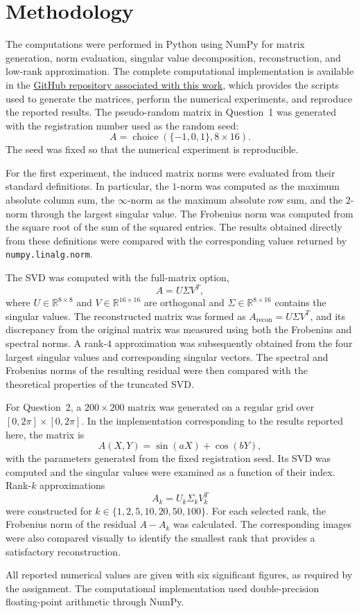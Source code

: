 \section{Methodology}

The computations were performed in Python using NumPy for matrix generation, norm evaluation, singular value decomposition, reconstruction, and low-rank approximation. The complete computational implementation is available in the \href{https://github.com/Ederson-Passos/computational-matrix-methods}{GitHub repository associated with this work}, which provides the scripts used to generate the matrices, perform the numerical experiments, and reproduce the reported results. The pseudo-random matrix in Question~1 was generated with the registration number used as the random seed:
\[
A = \operatorname{choice}(\{-1,0,1\}, 8\times16).
\]
The seed was fixed so that the numerical experiment is reproducible.

For the first experiment, the induced matrix norms were evaluated from their standard definitions. In particular, the $1$-norm was computed as the maximum absolute column sum, the $\infty$-norm as the maximum absolute row sum, and the $2$-norm through the largest singular value. The Frobenius norm was computed from the square root of the sum of the squared entries. The results obtained directly from these definitions were compared with the corresponding values returned by \texttt{numpy.linalg.norm}.

The SVD was computed with the full-matrix option,
\[
A = U\Sigma V^T,
\]
where $U\in\mathbb{R}^{8\times8}$ and $V\in\mathbb{R}^{16\times16}$ are orthogonal and $\Sigma\in\mathbb{R}^{8\times16}$ contains the singular values. The reconstructed matrix was formed as $A_{\mathrm{recon}}=U\Sigma V^T$, and its discrepancy from the original matrix was measured using both the Frobenius and spectral norms. A rank-$4$ approximation was subsequently obtained from the four largest singular values and corresponding singular vectors. The spectral and Frobenius norms of the resulting residual were then compared with the theoretical properties of the truncated SVD.

For Question~2, a $200\times200$ matrix was generated on a regular grid over $[0,2\pi]\times[0,2\pi]$. In the implementation corresponding to the results reported here, the matrix is
\[
A(X,Y) = \sin(aX) + \cos(bY),
\]
with the parameters generated from the fixed registration seed. Its SVD was computed and the singular values were examined as a function of their index. Rank-$k$ approximations
\[
A_k = U_k\Sigma_k V_k^T
\]
were constructed for $k\in\{1,2,5,10,20,50,100\}$. For each selected rank, the Frobenius norm of the residual $A-A_k$ was calculated. The corresponding images were also compared visually to identify the smallest rank that provides a satisfactory reconstruction.

All reported numerical values are given with six significant figures, as required by the assignment. The computational implementation used double-precision floating-point arithmetic through NumPy.